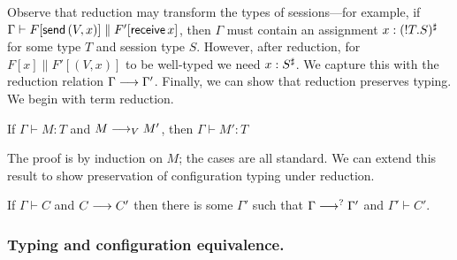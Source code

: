 \documentclass[oribibl,orivec,envcountsame]{llncs}
\begin{document}
Observe that reduction may transform the types of sessions---for example, if $\Gamma \vdash
F[\mathsf{send}\,(V,x)] \parallel F'[\mathsf{receive}\, x]$, then $\Gamma$ must contain an
assignment $x : ({!T.S})^\sharp$ for some type $T$ and session type $S$.  However, after
reduction, for $F[x] \parallel F'[(V,x)]$ to be well-typed we need $x:S^\sharp$.  We capture this
with the reduction relation $\Gamma \longrightarrow \Gamma'$.  Finally, we can show that reduction preserves
typing.  We begin with term reduction.
%
\begin{lemma}\label{lem:term-preservation}
  If $\Gamma \vdash M: T$ and $M \longrightarrow_V M'$, then $\Gamma \vdash M': T$
\end{lemma}
%
The proof is by induction on $M$; the cases are all standard.  We can extend this result to show
preservation of configuration typing under reduction.
%
\begin{theorem}\label{thm:preservation}
  If $\Gamma \vdash C$ and $C \longrightarrow C'$ then there is some $\Gamma'$ such that $\Gamma \longrightarrow^?
  \Gamma'$ and $\Gamma' \vdash C'$.
\end{theorem}
%

\subsubsection{Typing and configuration equivalence.}
\end{document}
